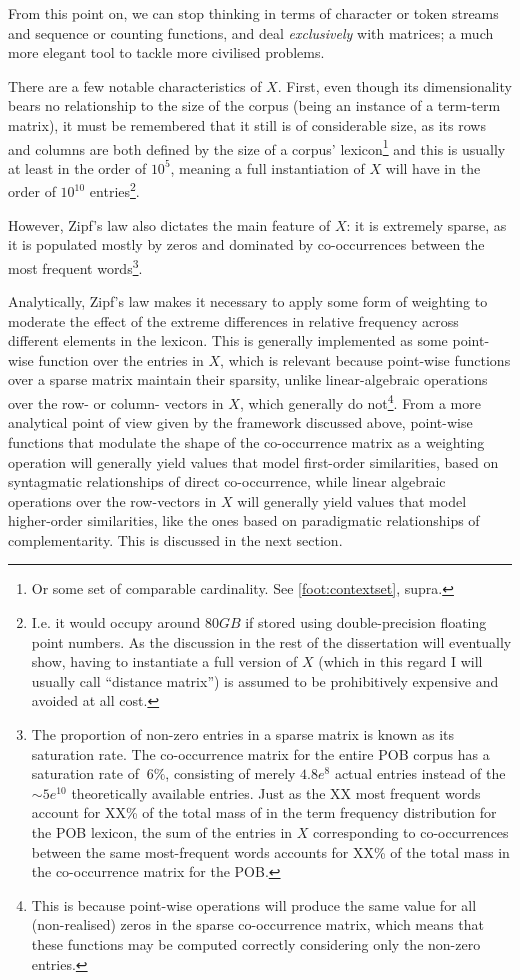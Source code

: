 From this point on, we can stop thinking in terms of character or token streams and sequence or counting functions, and deal \emph{exclusively} with matrices; a much more elegant tool to tackle more civilised problems.

There are a few notable characteristics of $X$.
First, even though its dimensionality bears no relationship to the size of the corpus (being an instance of a term-term matrix), it must be remembered that it still is of considerable size, as its rows and columns are both defined by the size of a corpus' lexicon\footnote{
    Or some set of comparable cardinality. See \autoref{foot:contextset}, supra.
} and this is usually at least in the order of $10^5$, meaning a full instantiation of $X$ will have in the order of $10^{10}$ entries\footnote{
    \label{foot:80gb}
    I.e. it would occupy around $80GB$ if stored using double-precision floating point numbers.
    As the discussion in the rest of the dissertation will eventually show, having to instantiate a full version of $X$ (which in this regard I will usually call ``distance matrix'') is assumed to be prohibitively expensive and avoided at all cost.
}.

However, Zipf's law also dictates the main feature of $X$: it is extremely sparse, as it is populated mostly by zeros and dominated by co-occurrences between the most frequent words\footnote{
    \label{foot:sparsity}
    The proportion of non-zero entries in a sparse matrix is known as its saturation rate.
    The co-occurrence matrix for the entire POB corpus has a saturation rate of $~6\%$, consisting of merely $4.8e^{8}$ actual entries instead of the $\sim5e^{10}$ theoretically available entries.
    Just as the XX most frequent words account for XX\% of the total mass of in the term frequency distribution for the POB lexicon, the sum of the entries in $X$ corresponding to co-occurrences between the same most-frequent words accounts for XX\% of the total mass in the co-occurrence matrix for the POB.
}.

Analytically, Zipf's law makes it necessary to apply some form of weighting to moderate the effect of the extreme differences in relative frequency across different elements in the lexicon.
This is generally implemented as some point-wise function over the entries in $X$, which is relevant because point-wise functions over a sparse matrix maintain their sparsity, unlike linear-algebraic operations over the row- or column- vectors in $X$, which generally do not\footnote{
    \label{foot:nnzeros}
    This is because point-wise operations will produce the same value for all (non-realised) zeros in the sparse co-occurrence matrix, which means that these functions may be computed correctly considering only the non-zero entries.
}.
From a more analytical point of view given by the framework discussed above, point-wise functions that modulate the shape of the co-occurrence matrix as a weighting operation will generally yield values that model first-order similarities, based on syntagmatic relationships of direct co-occurrence, while linear algebraic operations over the row-vectors in $X$ will generally yield values that model higher-order similarities, like the ones based on paradigmatic relationships of complementarity.
This is discussed in the next section.

